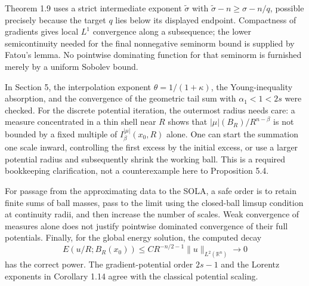 \documentclass[10pt]{article}
\begin{document}
Theorem 1.9 uses a strict intermediate exponent \(\widetilde\sigma\) with \(\widetilde\sigma-n\geq\sigma-n/q\), possible precisely because the target \(q\) lies below its displayed endpoint. Compactness of gradients gives local \(L^1\) convergence along a subsequence; the lower semicontinuity needed for the final nonnegative seminorm bound is supplied by Fatou’s lemma. No pointwise dominating function for that seminorm is furnished merely by a uniform Sobolev bound.\par
In Section 5, the interpolation exponent \(\theta=1/(1+\kappa)\), the Young-inequality absorption, and the convergence of the geometric tail sum with \(\alpha_1<1<2s\) were checked. For the discrete potential iteration, the outermost radius needs care: a measure concentrated in a thin shell near \(R\) shows that \(|\mu|(B_R)/R^{n-\beta}\) is not bounded by a fixed multiple of \(I_\beta^{|\mu|}(x_0,R)\) alone. One can start the summation one scale inward, controlling the first excess by the initial excess, or use a larger potential radius and subsequently shrink the working ball. This is a required bookkeeping clarification, not a counterexample here to Proposition 5.4.\par
For passage from the approximating data to the SOLA, a safe order is to retain finite sums of ball masses, pass to the limit using the closed-ball limsup condition at continuity radii, and then increase the number of scales. Weak convergence of measures alone does not justify pointwise dominated convergence of their full potentials. Finally, for the global energy solution, the computed decay \[E(u/R;B_R(x_0))\leq C R^{-n/2-1}\|u\|_{L^2(\mathbb R^n)}
       \longrightarrow0\] has the correct power. The gradient-potential order \(2s-1\) and the Lorentz exponents in Corollary 1.14 agree with the classical potential scaling.\par
\end{document}
